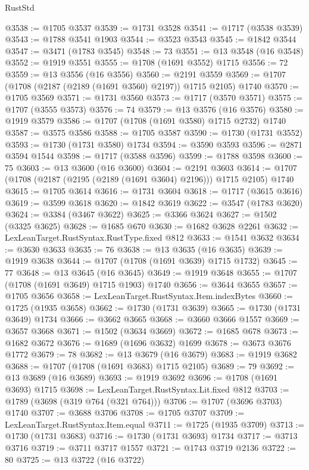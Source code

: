\begin{lexlean}{RustStd}
\begin{coremodule}
@3538 := @1705 @3537
@3539 := @1731 @3528
@3541 := @1717 (@3538 @3539)
@3543 := @1788 @3541 @1903
@3544 := @3523 @3543
@3545 := @1842 @3544
@3547 := @3471 (@1783 @3545)
@3548 := 73
@3551 := @13 @3548 (@16 @3548)
@3552 := @1919 @3551
@3555 := @1708 (@1691 @3552) @1715
@3556 := 72
@3559 := @13 @3556 (@16 @3556)
@3560 := @2191 @3559
@3569 := @1707 (@1708 (@2187 (@2189 (@1691 @3560) @2197)) @1715 @2105) @1740
@3570 := @1705 @3569
@3571 := @1731 @3560
@3573 := @1717 (@3570 @3571)
@3575 := @1707 (@3555 @3573)
@3576 := 74
@3579 := @13 @3576 (@16 @3576)
@3580 := @1919 @3579
@3586 := @1707 (@1708 (@1691 @3580) @1715 @2732) @1740
@3587 := @3575 @3586
@3588 := @1705 @3587
@3590 := @1730 (@1731 @3552)
@3593 := @1730 (@1731 @3580) @1734
@3594 := @3590 @3593
@3596 := @2871 @3594 @1544
@3598 := @1717 (@3588 @3596)
@3599 := @1788 @3598
@3600 := 75
@3603 := @13 @3600 (@16 @3600)
@3604 := @2191 @3603
@3614 := @1707 (@1708 (@2187 (@2195 (@2189 (@1691 @3604) @2196))) @1715 @2105) @1740
@3615 := @1705 @3614
@3616 := @1731 @3604
@3618 := @1717 (@3615 @3616)
@3619 := @3599 @3618
@3620 := @1842 @3619
@3622 := @3547 (@1783 @3620)
@3624 := @3384 (@3467 @3622)
@3625 := @3366 @3624
@3627 := @1502 (@3325 @3625)
@3628 := @1685 @670
@3630 := @1682 @3628 @2261
@3632 := LexLeanTarget.RustSyntax.RustType.fixed @812
@3633 := @1541 @3632
@3634 := @3630 @3633
@3635 := 76
@3638 := @13 @3635 (@16 @3635)
@3639 := @1919 @3638
@3644 := @1707 (@1708 (@1691 @3639) @1715 @1732)
@3645 := 77
@3648 := @13 @3645 (@16 @3645)
@3649 := @1919 @3648
@3655 := @1707 (@1708 (@1691 @3649) @1715 @1903) @1740
@3656 := @3644 @3655
@3657 := @1705 @3656
@3658 := LexLeanTarget.RustSyntax.Item.indexBytes
@3660 := @1725 (@1935 @3658)
@3662 := @1730 (@1731 @3639)
@3665 := @1730 (@1731 @3649) @1734
@3666 := @3662 @3665
@3668 := @3660 @3666 @1557
@3669 := @3657 @3668
@3671 := @1502 (@3634 @3669)
@3672 := @1685 @678
@3673 := @1682 @3672
@3676 := @1689 (@1696 @3632) @1699
@3678 := @3673 @3676 @1772
@3679 := 78
@3682 := @13 @3679 (@16 @3679)
@3683 := @1919 @3682
@3688 := @1707 (@1708 (@1691 @3683) @1715 @2105)
@3689 := 79
@3692 := @13 @3689 (@16 @3689)
@3693 := @1919 @3692
@3696 := @1708 (@1691 @3693) @1715
@3698 := LexLeanTarget.RustSyntax.Lit.fixed @812
@3703 := @1789 (@3698 (@319 @764 (@321 @764)))
@3706 := @1707 (@3696 @3703) @1740
@3707 := @3688 @3706
@3708 := @1705 @3707
@3709 := LexLeanTarget.RustSyntax.Item.equal
@3711 := @1725 (@1935 @3709)
@3713 := @1730 (@1731 @3683)
@3716 := @1730 (@1731 @3693) @1734
@3717 := @3713 @3716
@3719 := @3711 @3717 @1557
@3721 := @1743 @3719 @2136
@3722 := 80
@3725 := @13 @3722 (@16 @3722)

\end{coremodule}
\end{lexlean}
